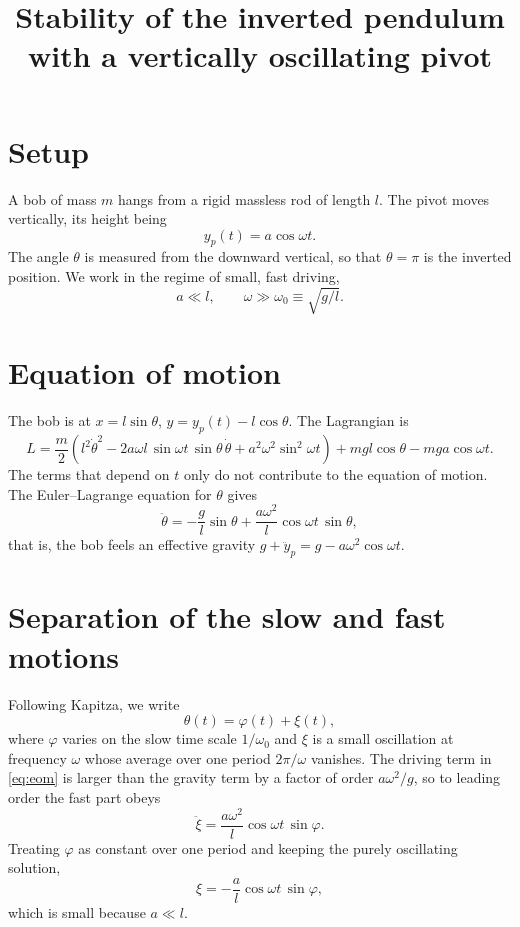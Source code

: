 \documentclass{article}
\title{Stability of the inverted pendulum with a vertically oscillating pivot}
\date{}
\begin{document}
\maketitle

\section{Setup}
A bob of mass $m$ hangs from a rigid massless rod of length $l$. The pivot moves vertically, its height being
\begin{equation}
  y_p(t) = a\cos\omega t .
  \label{eq:pivot}
\end{equation}
The angle $\theta$ is measured from the downward vertical, so that $\theta=\pi$ is the inverted position. We work in the regime of small, fast driving,
\begin{equation}
  a \ll l, \qquad \omega \gg \omega_0 \equiv \sqrt{g/l} .
  \label{eq:regime}
\end{equation}

\section{Equation of motion}
The bob is at $x = l\sin\theta$, $y = y_p(t) - l\cos\theta$. The Lagrangian is
\begin{equation}
  L = \frac{m}{2}\left(l^2\dot\theta^2 - 2a\omega l\,\sin\omega t\,\sin\theta\,\dot\theta + a^2\omega^2\sin^2\omega t\right) + mgl\cos\theta - mga\cos\omega t .
  \label{eq:lagrangian}
\end{equation}
The terms that depend on $t$ only do not contribute to the equation of motion. The Euler--Lagrange equation for $\theta$ gives
\begin{equation}
  \ddot\theta = -\frac{g}{l}\sin\theta + \frac{a\omega^2}{l}\cos\omega t\,\sin\theta ,
  \label{eq:eom}
\end{equation}
that is, the bob feels an effective gravity $g + \ddot y_p = g - a\omega^2\cos\omega t$.

\section{Separation of the slow and fast motions}
Following Kapitza, we write
\begin{equation}
  \theta(t) = \varphi(t) + \xi(t),
  \label{eq:split}
\end{equation}
where $\varphi$ varies on the slow time scale $1/\omega_0$ and $\xi$ is a small oscillation at frequency $\omega$ whose average over one period $2\pi/\omega$ vanishes. The driving term in \eqref{eq:eom} is larger than the gravity term by a factor of order $a\omega^2/g$, so to leading order the fast part obeys
\begin{equation}
  \ddot\xi = \frac{a\omega^2}{l}\cos\omega t\,\sin\varphi .
  \label{eq:fast-eq}
\end{equation}
Treating $\varphi$ as constant over one period and keeping the purely oscillating solution,
\begin{equation}
  \xi = -\frac{a}{l}\cos\omega t\,\sin\varphi ,
  \label{eq:xi}
\end{equation}
which is small because $a\ll l$.
\end{document}
